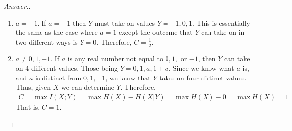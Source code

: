 \documentclass[10pt,twoside]{article}
\begin{document}
\begin{itemize}
\begin{proof}[Answer.]
\begin{enumerate}
        \item $a = -1$. If $a = -1$ then $Y$ must take on values $Y = -1, 0, 1$. This is essentially the same as the case where $a = 1$ except the outcome that $Y$ can take on in two different ways is $Y = 0$. Therefore, $C = \frac{1}{2}$.

        \item $a \neq 0, 1, -1$. If $a$ is any real number not equal to $0, 1,$ or $-1$, then $Y$ can take on $4$ different values. Those being $Y = 0, 1, a, 1 + a$. Since we know what $a$ is, and $a$ is distinct from $0, 1, -1$, we know that $Y$ takes on four distinct values. Thus, given $X$ we can determine $Y$. Therefore,
        \begin{gather*}
            C = \max I(X;Y) = \max H(X) - H(X|Y) = \max H(X) - 0 = \max H(X) = 1
        \end{gather*}
        That is, $C =1$.
        
    \end{enumerate}
    \end{proof}

\newpage
    

\end{itemize}
\end{document}
